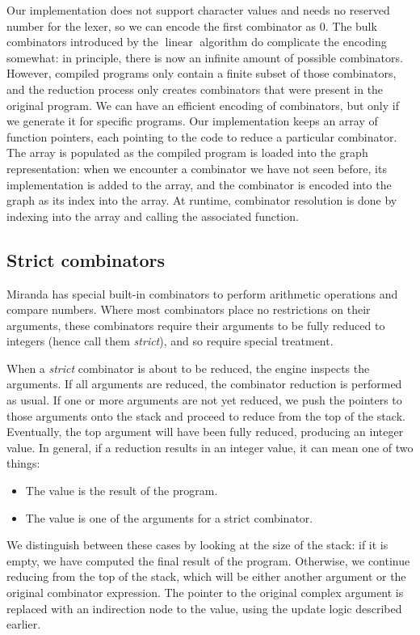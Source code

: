 \documentclass[conference]{IEEEtran}
\DeclareMathOperator{\linear}{linear}
\begin{document}
Our implementation does not support character values and needs no reserved number for the lexer, so we can encode the first combinator as $0$.
The bulk combinators introduced by the $\linear$ algorithm do complicate the encoding somewhat:
in principle, there is now an infinite amount of possible combinators.
However, compiled programs only contain a finite subset of those combinators, and the reduction process only creates combinators that were present in the original program.
We can have an efficient encoding of combinators, but only if we generate it for specific programs.
Our implementation keeps an array of function pointers, each pointing to the code to reduce a particular combinator.
The array is populated as the compiled program is loaded into the graph representation:
when we encounter a combinator we have not seen before, its implementation is added to the array, and the combinator is encoded into the graph as its index into the array.
At runtime, combinator resolution is done by indexing into the array and calling the associated function.

\subsection{Strict combinators}
\label{sec:strict}
Miranda has special built-in combinators to perform arithmetic operations and compare numbers.
Where most combinators place no restrictions on their arguments, these combinators require their arguments to be fully reduced to integers (hence call them \textit{strict}), and so require special treatment.

When a \textit{strict} combinator is about to be reduced, the engine inspects the arguments.
If all arguments are reduced, the combinator reduction is performed as usual.
If one or more arguments are not yet reduced, we push the pointers to those arguments onto the stack and proceed to reduce from the top of the stack.
Eventually, the top argument will have been fully reduced, producing an integer value.
In general, if a reduction results in an integer value, it can mean one of two things:
\begin{itemize}
    \item The value is the result of the program.
    \item The value is one of the arguments for a strict combinator.
\end{itemize}
We distinguish between these cases by looking at the size of the stack: if it is empty, we have computed the final result of the program.
Otherwise, we continue reducing from the top of the stack, which will be either another argument or the original combinator expression.
The pointer to the original complex argument is replaced with an indirection node to the value, using the update logic described earlier.
\end{document}
